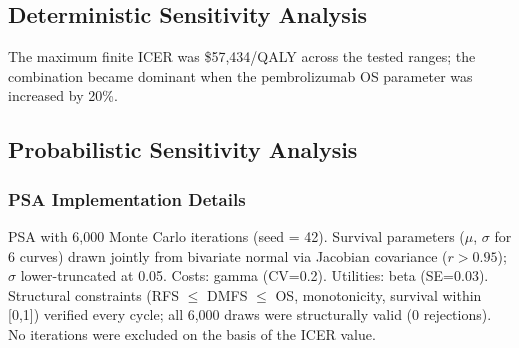\documentclass[11pt,a4paper]{article}
\begin{document}
\subsection{Deterministic Sensitivity Analysis}
\label{sec:dsa}
\begin{table}[H]
\centering
\caption{One-Way Deterministic Sensitivity Analysis}
\label{tab:s11}
\end{table}
\noindent The maximum finite ICER was \$57,434/QALY across the tested ranges; the combination became dominant when the \mbox{pembrolizumab} OS parameter was increased by 20\%.

\subsection{Probabilistic Sensitivity Analysis}
\label{sec:psa}

\subsubsection{PSA Implementation Details}
PSA with 6,000 Monte Carlo iterations (seed = 42). Survival parameters ($\mu$, $\sigma$ for 6 curves) drawn jointly from bivariate normal via Jacobian covariance ($r > 0.95$); $\sigma$ lower-truncated at 0.05. Costs: gamma (CV=0.2). Utilities: beta (SE=0.03). Structural constraints (RFS $\leq$ DMFS $\leq$ OS, monotonicity, survival within [0,1]) verified every cycle; all 6,000 draws were structurally valid (0 rejections). No iterations were excluded on the basis of the ICER value.
\end{document}
